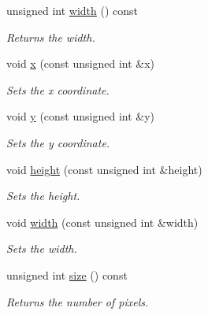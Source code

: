 \begin{CompactItemize}
unsigned int \hyperlink{class_clip_location_880badb9dceecb7878a08b7bdc5a4287}{width} () const 
\begin{CompactList}\small\item\em Returns the width. \item\end{CompactList}\item 
void \hyperlink{class_clip_location_f983f4cfe6ad80aa96cbbb4b53aec968}{x} (const unsigned int \&x)
\begin{CompactList}\small\item\em Sets the x coordinate. \item\end{CompactList}\item 
void \hyperlink{class_clip_location_3c665324e5faf6bae4013d936f0ce2dc}{y} (const unsigned int \&y)
\begin{CompactList}\small\item\em Sets the y coordinate. \item\end{CompactList}\item 
void \hyperlink{class_clip_location_f0e979e989c1cecbca6fe2da92b383f7}{height} (const unsigned int \&height)
\begin{CompactList}\small\item\em Sets the height. \item\end{CompactList}\item 
void \hyperlink{class_clip_location_7dc15a35acc1594dfc1e5f64ca33d3b9}{width} (const unsigned int \&width)
\begin{CompactList}\small\item\em Sets the width. \item\end{CompactList}\item 
unsigned int \hyperlink{class_clip_location_2d01b03e23d610b26bbb2e18278cf5a8}{size} () const 
\begin{CompactList}\small\item\em Returns the number of pixels. \item\end{CompactList}\end{CompactItemize}
